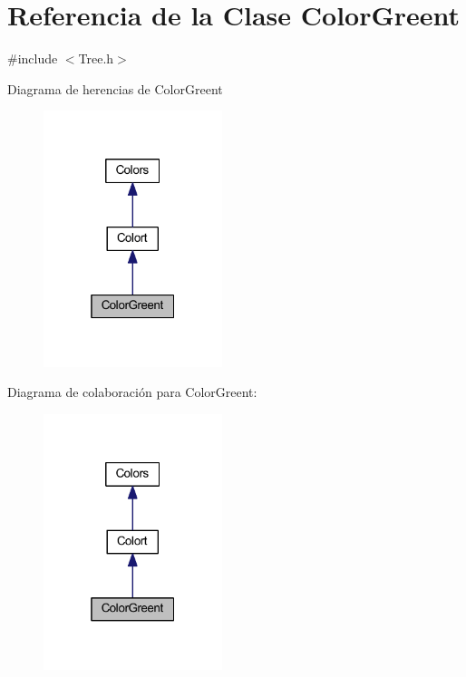 \hypertarget{class_color_greent}{}\section{Referencia de la Clase Color\+Greent}
\label{class_color_greent}


{\ttfamily \#include $<$Tree.\+h$>$}



Diagrama de herencias de Color\+Greent
\nopagebreak
\begin{figure}[H]
\begin{center}
\leavevmode
\includegraphics[width=148pt]{class_color_greent__inherit__graph}
\end{center}
\end{figure}


Diagrama de colaboración para Color\+Greent\+:
\nopagebreak
\begin{figure}[H]
\begin{center}
\leavevmode
\includegraphics[width=148pt]{class_color_greent__coll__graph}
\end{center}
\end{figure}
